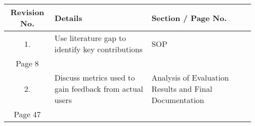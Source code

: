 \begin{table}[ht]
    \centering
    \begin{tabular}{|c|p{8cm}|p{5cm}|}
    \hline
    \textbf{Revision No.} & \textbf{Details} & \textbf{Section / Page No.} \\ \hline
    1. & Use literature gap to identify key contributions & SOP \\ Page 8 \\ \hline
    2. & Discuss metrics used to gain feedback from actual users & Analysis of Evaluation Results and Final Documentation \\ Page 47 \\ \hline
    \end{tabular}

\end{table}